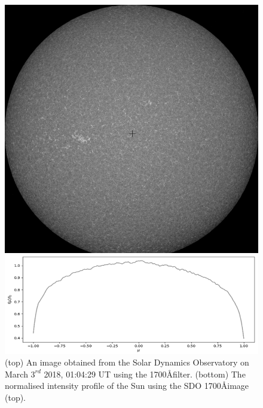 \begin{figure}
\includegraphics[scale = 0.5]{4-images/imb_darkening}
\caption{(top) An image obtained from the Solar Dynamics Observatory on March $3^{rd}$ 2018, 01:04:29 UT using the 1700\AA filter. (bottom) The normalised intensity profile of the Sun using the SDO 1700\AA image (top).  }
\label{theory:fig:SDO_1700A}
\end{figure}

